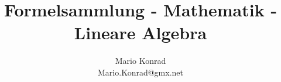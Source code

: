 \documentclass[10pt,a4paper,oneside]{article}
\begin{document}
\title{Formelsammlung - Mathematik - Lineare Algebra}
\author{Mario Konrad\\Mario.Konrad@gmx.net}
\maketitle
\tableofcontents

\end{document}
